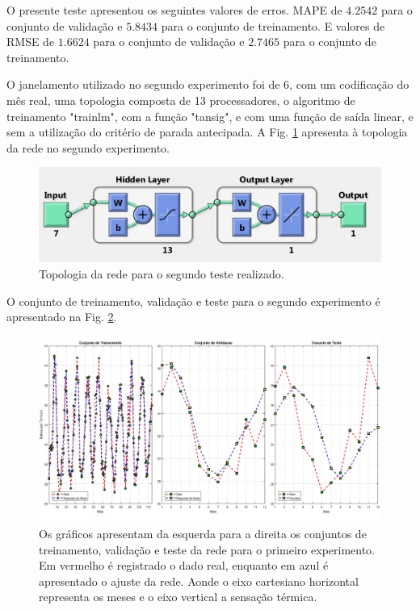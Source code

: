 \documentclass[journal, a4paper]{IEEEtran}
\begin{document}
O presente teste apresentou os seguintes valores de erros. MAPE de $4.2542$ para o conjunto de validação e $5.8434$ para o conjunto de treinamento. E valores de RMSE de $1.6624$ para o conjunto de validação e $2.7465$ para o conjunto de treinamento. 

O janelamento utilizado no segundo experimento foi de 6, com um codificação do mês real, uma topologia composta de 13 processadores, o algoritmo de treinamento "trainlm", com a função "tansig", e com uma função de saída linear, e sem a utilização do critério de parada antecipada. A Fig. \ref{topo2} apresenta à topologia da rede no segundo experimento. 

\begin{figure}[H]
	\centering
	\includegraphics[scale=0.5]{Images/topologia2.jpg}
	\caption{Topologia da rede para o segundo teste realizado.}
	\label{topo2}
\end{figure} 


O conjunto de treinamento, validação e teste para o segundo experimento é apresentado na Fig. \ref{teste2}.

\begin{figure}[H]
	\centering
	\includegraphics[scale=0.15]{Images/Teste2.jpg}
	\caption{Os gráficos apresentam da esquerda para a direita os conjuntos de treinamento, validação e teste da rede para o primeiro experimento. Em vermelho é registrado o dado real, enquanto em azul é apresentado o ajuste da rede. Aonde o eixo cartesiano horizontal representa os meses e o eixo vertical a sensação térmica.}
	\label{teste2}
\end{figure} 
\end{document}
